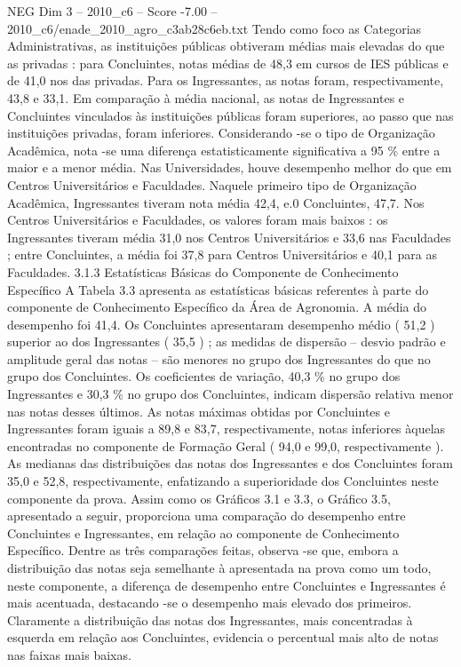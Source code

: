 \begin{textsample}{NEG Dim 3 – 2010\_c6 – Score -7.00 – 2010\_c6/enade\_2010\_agro\_c3ab28c6eb.txt}
Tendo como foco as Categorias Administrativas, as instituições públicas obtiveram médias mais elevadas do que as privadas : para Concluintes, notas médias de 48,3 em cursos de IES públicas e de 41,0 nos das privadas.
Para os Ingressantes, as notas foram, respectivamente, 43,8 e 33,1.
Em comparação à média nacional, as notas de Ingressantes e Concluintes vinculados às instituições públicas foram superiores, ao passo que nas instituições privadas, foram inferiores.
Considerando -se o tipo de Organização Acadêmica, nota -se uma diferença estatisticamente significativa a 95 \% entre a maior e a menor média.
Nas Universidades, houve desempenho melhor do que em Centros Universitários e Faculdades.
Naquele primeiro tipo de Organização Acadêmica, Ingressantes tiveram nota média 42,4, e.0 Concluintes, 47,7.
Nos Centros Universitários e Faculdades, os valores foram mais baixos : os Ingressantes tiveram média 31,0 nos Centros Universitários e 33,6 nas Faculdades ; entre Concluintes, a média foi 37,8 para Centros Universitários e 40,1 para as Faculdades. 3.1.3 Estatísticas Básicas do Componente de Conhecimento Específico A Tabela 3.3 apresenta as estatísticas básicas referentes à parte do componente de Conhecimento Específico da Área de Agronomia.
A média do desempenho foi 41,4.
Os Concluintes apresentaram desempenho médio ( 51,2 ) superior ao dos Ingressantes ( 35,5 ) ; as medidas de dispersão – desvio padrão e amplitude geral das notas – são menores no grupo dos Ingressantes do que no grupo dos Concluintes.
Os coeficientes de variação, 40,3 \% no grupo dos Ingressantes e 30,3 \% no grupo dos Concluintes, indicam dispersão relativa menor nas notas desses últimos.
As notas máximas obtidas por Concluintes e Ingressantes foram iguais a 89,8 e 83,7, respectivamente, notas inferiores àquelas encontradas no componente de Formação Geral ( 94,0 e 99,0, respectivamente ).
As medianas das distribuições das notas dos Ingressantes e dos Concluintes foram 35,0 e 52,8, respectivamente, enfatizando a superioridade dos Concluintes neste componente da prova.
Assim como os Gráficos 3.1 e 3.3, o Gráfico 3.5, apresentado a seguir, proporciona uma comparação do desempenho entre Concluintes e Ingressantes, em relação ao componente de Conhecimento Específico.
Dentre as três comparações feitas, observa -se que, embora a distribuição das notas seja semelhante à apresentada na prova como um todo, neste componente, a diferença de desempenho entre Concluintes e Ingressantes é mais acentuada, destacando -se o desempenho mais elevado dos primeiros.
Claramente a distribuição das notas dos Ingressantes, mais concentradas à esquerda em relação aos Concluintes, evidencia o percentual mais alto de notas nas faixas mais baixas.

\end{textsample}
